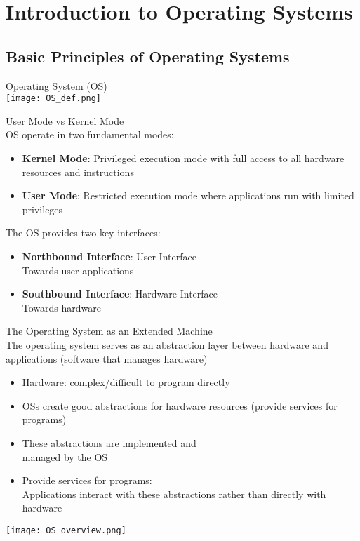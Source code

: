 \section{Introduction to Operating Systems}

\subsection{Basic Principles of Operating Systems}


\begin{definition}{Operating System (OS)}\\
    \texttt{[image: OS\_def.png]}
\end{definition}

\begin{theorem}{User Mode vs Kernel Mode}\\
    OS operate in two fundamental modes:
    \begin{itemize}
        \item \textbf{Kernel Mode}: Privileged execution mode with full access to all hardware resources and instructions
        \item \textbf{User Mode}: Restricted execution mode where applications run with limited privileges
    \end{itemize}
    
    The OS provides two key interfaces:
    \begin{itemize}
        \item \textbf{Northbound Interface}: User Interface \\ Towards user applications
        \item \textbf{Southbound Interface}: Hardware Interface \\ Towards hardware
    \end{itemize}
\end{theorem}

\multend


\begin{concept}{The Operating System as an Extended Machine}\\
    The operating system serves as an abstraction layer between hardware and applications (software that manages hardware)
    \begin{itemize}
        \item Hardware: complex/difficult to program directly
        \item OSs create good abstractions for hardware resources (provide services for programs)
        \item These abstractions are implemented and \\ managed by the OS
        \item Provide services for programs: \\ Applications interact with these abstractions rather than directly with hardware
    \end{itemize}
    \texttt{[image: OS\_overview.png]}
\end{concept}

